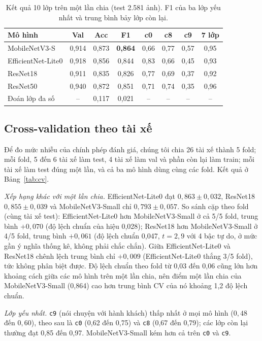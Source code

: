 \documentclass[10pt,a4paper,twocolumn]{article}
\newcommand{\cls}[1]{\texttt{#1}}
\begin{document}
\begin{table}[t]
\centering\small
\caption{Kết quả 10 lớp trên một lần chia (test 2.581 ảnh). F1 của ba lớp yếu nhất và trung bình bảy lớp còn lại.}
\label{tab:main}
\setlength{\tabcolsep}{3pt}
\begin{tabular}{@{}lccccccc@{}}
\toprule
Mô hình & Val & Acc & F1 & c0 & c8 & c9 & 7 lớp \\
\midrule
MobileNetV3-S & 0,914 & 0,873 & \textbf{0,864} & 0,66 & 0,77 & 0,57 & 0,95 \\
EfficientNet-Lite0 & 0,918 & 0,856 & 0,844 & 0,83 & 0,66 & 0,45 & 0,93 \\
ResNet18 & 0,911 & 0,835 & 0,826 & 0,77 & 0,69 & 0,37 & 0,92 \\
ResNet50 & 0,940 & 0,872 & 0,851 & 0,71 & 0,74 & 0,35 & 0,96 \\
\midrule
Đoán lớp đa số & -- & 0,117 & 0,021 & -- & -- & -- & -- \\
\bottomrule
\end{tabular}
\end{table}

\subsection{Cross-validation theo tài xế}
\label{sec:cv}
Để đo mức nhiễu của chính phép đánh giá, chúng tôi chia 26 tài xế thành 5 fold; mỗi fold, 5 đến 6 tài xế làm test, 4 tài xế làm val và phần còn lại làm train; mỗi tài xế làm test đúng một lần, và cả ba mô hình dùng cùng các fold. Kết quả ở Bảng~\ref{tab:cv}.

\emph{Xếp hạng khác với một lần chia.} EfficientNet-Lite0 đạt $0{,}863 \pm 0{,}032$, ResNet18 $0{,}855 \pm 0{,}039$ và MobileNetV3-Small chỉ $0{,}793 \pm 0{,}057$. So sánh cặp theo fold (cùng tài xế test): EfficientNet-Lite0 hơn MobileNetV3-Small ở cả 5/5 fold, trung bình $+0{,}070$ (độ lệch chuẩn của hiệu 0,028); ResNet18 hơn MobileNetV3-Small ở 4/5 fold, trung bình $+0{,}061$ (độ lệch chuẩn 0,047, $t=2{,}9$ với 4 bậc tự do, ở mức gần ý nghĩa thống kê, không phải chắc chắn). Giữa EfficientNet-Lite0 và ResNet18 chênh lệch trung bình chỉ $+0{,}009$ (EfficientNet-Lite0 thắng 3/5 fold), tức không phân biệt được. Độ lệch chuẩn theo fold từ 0,03 đến 0,06 cũng lớn hơn khoảng cách giữa các mô hình trên một lần chia, nên điểm một lần chia của MobileNetV3-Small (0,864) cao hơn trung bình CV của nó khoảng 1,2 độ lệch chuẩn.

\emph{Lớp yếu nhất.} \cls{c9} (nói chuyện với hành khách) thấp nhất ở mọi mô hình ($0{,}48$ đến $0{,}60$), theo sau là \cls{c0} (0,62 đến 0,75) và \cls{c8} (0,67 đến 0,79); các lớp còn lại thường đạt 0,85 đến 0,97. MobileNetV3-Small kém hơn cả trên \cls{c0} và \cls{c9}.
\end{document}
